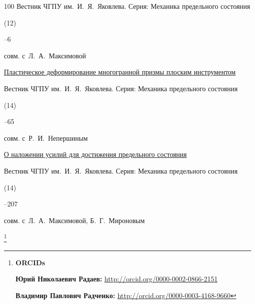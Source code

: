\begin{thebibliography}{100}
\jour Вестник ЧГПУ им.~И.~Я.~Яковлева. Серия: Механика предельного состояния


(12)

–6 

\miscnote совм. с~Л.~А.~Максимовой





\paper \href{http://elibrary.ru/item.asp?id=18359345}{Пластическое деформирование многогранной призмы плоским инструментом}

\jour Вестник ЧГПУ им.~И.~Я.~Яковлева. Серия: Механика предельного состояния


(14)

–65 

\miscnote совм. с~Р.~И.~Непершиным







\paper \href{http://elibrary.ru/item.asp?id=18359361}{О наложении усилий для достижения предельного состояния}

\jour Вестник \mbox{ЧГПУ} им.~И.~Я.~Яковлева. Серия: Механика предельного состояния


(14)

–207 

\miscnote совм. с~Л.~А.~Максимовой, Б.~Г.~Мироновым






\end{thebibliography}





\thanks{{\bf ORCIDs}



{\bf   	Юрий Николаевич Радаев:}    \url{http://orcid.org/0000-0002-0866-2151}



{\bf Владимир Павлович Радченко:}    \url{http://orcid.org/0000-0003-4168-9660}



}







